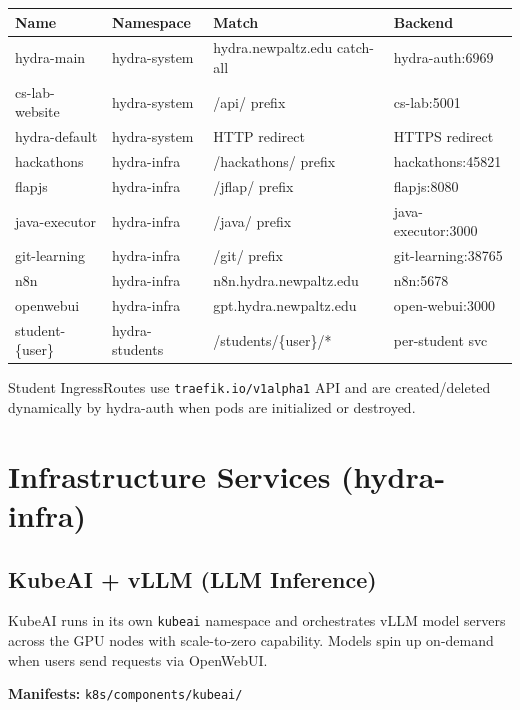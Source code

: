\documentclass[11pt,a4paper]{article}
\begin{document}
\begin{table}[H]
\centering
\small
\begin{tabular}{llll}
\toprule
\textbf{Name} & \textbf{Namespace} & \textbf{Match} & \textbf{Backend} \\
\midrule
hydra-main & hydra-system & hydra.newpaltz.edu catch-all & hydra-auth:6969 \\
cs-lab-website & hydra-system & /api/ prefix & cs-lab:5001 \\
hydra-default & hydra-system & HTTP redirect & HTTPS redirect \\
hackathons & hydra-infra & /hackathons/ prefix & hackathons:45821 \\
flapjs & hydra-infra & /jflap/ prefix & flapjs:8080 \\
java-executor & hydra-infra & /java/ prefix & java-executor:3000 \\
git-learning & hydra-infra & /git/ prefix & git-learning:38765 \\
n8n & hydra-infra & n8n.hydra.newpaltz.edu & n8n:5678 \\
openwebui & hydra-infra & gpt.hydra.newpaltz.edu & open-webui:3000 \\
student-\{user\} & hydra-students & /students/\{user\}/* & per-student svc \\
\bottomrule
\end{tabular}
\end{table}

\begin{infobox}
Student IngressRoutes use \texttt{traefik.io/v1alpha1} API and are created/deleted dynamically by hydra-auth when pods are initialized or destroyed.
\end{infobox}

\section{Infrastructure Services (hydra-infra)}

\subsection{KubeAI + vLLM (LLM Inference)}

KubeAI runs in its own \texttt{kubeai} namespace and orchestrates vLLM model servers across the GPU nodes with scale-to-zero capability. Models spin up on-demand when users send requests via OpenWebUI.

\textbf{Manifests:} \texttt{k8s/components/kubeai/}
\end{document}
